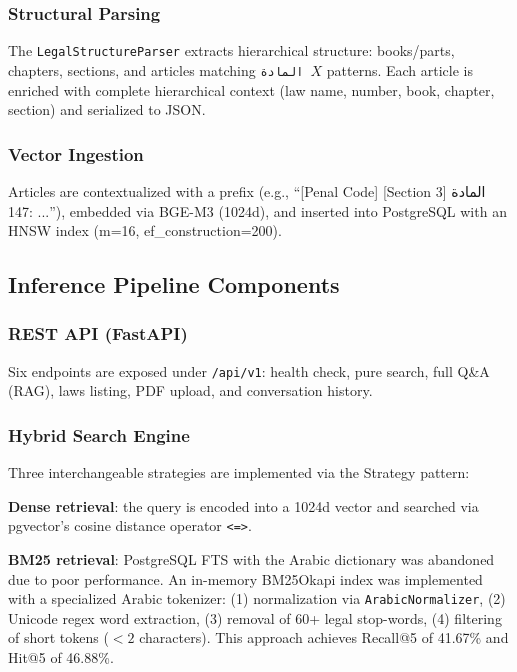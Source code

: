 \subsubsection{Structural Parsing}

The \texttt{LegalStructureParser} extracts hierarchical structure:
books/parts, chapters, sections, and articles matching
\texttt{المادة $X$} patterns. Each article is enriched with complete
hierarchical context (law name, number, book, chapter, section) and
serialized to JSON.

\subsubsection{Vector Ingestion}

Articles are contextualized with a prefix (e.g., ``[Penal Code] [Section 3]
\textarabic{المادة 147: ...}''), embedded via BGE-M3 (1024d), and inserted
into PostgreSQL with an HNSW index (m=16, ef\_construction=200).

\subsection{Inference Pipeline Components}

\subsubsection{REST API (FastAPI)}

Six endpoints are exposed under \texttt{/api/v1}: health check, pure
search, full Q\&A (RAG), laws listing, PDF upload, and conversation
history.

\subsubsection{Hybrid Search Engine}

Three interchangeable strategies are implemented via the Strategy pattern:

\textbf{Dense retrieval}: the query is encoded into a 1024d vector and
searched via pgvector's cosine distance operator \texttt{<=>}.

\textbf{BM25 retrieval}: PostgreSQL FTS with the Arabic dictionary was
abandoned due to poor performance. An in-memory BM25Okapi index was
implemented with a specialized Arabic tokenizer: (1) normalization via
\texttt{ArabicNormalizer}, (2) Unicode regex word extraction,
(3) removal of 60+ legal stop-words, (4) filtering of short tokens
($<2$ characters). This approach achieves Recall@5 of 41.67\% and
Hit@5 of 46.88\%.

